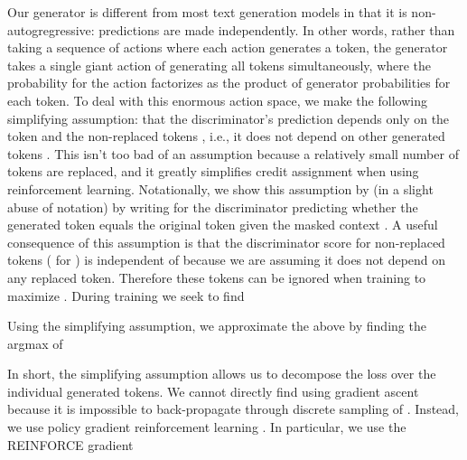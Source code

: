 \documentclass{article}
\newcommand{\alns}[1] {
	
}
\newcommand{\bmx}{\bm{x}^\text{masked}}
\newcommand{\bfx}{\bm{x}^\text{corrupt}}
\newcommand{\fx}{x^\text{corrupt}}
\newcommand{\bx}{\bm{x}}
\newcommand{\hbx}{\hat{\bm{x}}}
\newcommand{\E} {\mathop{\mathbb{E}}}
\newcommand{\D}{D}
\newcommand{\I}{\bm{m}}
\newcommand{\lossds}{\mathcal{L}_\text{Disc}}
\DeclareMathOperator*{\argmax}{arg\,max}
\begin{document}
Our generator is different from most text generation models in that it is non-autogregressive: predictions are made independently. 
In other words, rather than taking a sequence of actions where each action generates a token, the generator takes a single giant action of generating all tokens simultaneously, where the probability for the action factorizes as the product of generator probabilities for each token. 
To deal with this enormous action space, we make the following simplifying assumption: that the discriminator's prediction  depends only on the token  and the non-replaced tokens , i.e., it does not depend on other generated tokens . This isn't too bad of an assumption because a relatively small number of tokens are replaced, and it greatly simplifies credit assignment when using reinforcement learning. 
Notationally, we show this assumption by (in a slight abuse of notation) by writing  for the discriminator predicting whether the generated token  equals the original token  given the masked context . 
A useful consequence of this assumption is that the discriminator score for non-replaced tokens ( for ) is independent of  because we are assuming it does not depend on any replaced token. Therefore these tokens can be ignored when training  to maximize . 
During training we seek to find 
\alns{
\argmax_{\theta_G} \lossds = \argmax_{\theta_G} \E_{\bx, \I, \hbx} \Bigg(\sum_{t=1}^n -&\mathbbm{1}(\fx_t = x_t)\log \D(\bfx, t) - \\ &\mathbbm{1}(\fx_t \neq x_t)\log(1 - \D(\bfx, t)) \Bigg)
}
Using the simplifying assumption, we approximate the above by finding the argmax of 
\alns{
&\E_{\bx, \I, \hbx} \Bigg(\sum_{t \in \I}- \mathbbm{1}(\hat{x}_t = x_t)\log \D(\hat{x}|\bmx) - \mathbbm{1}(\hat{x}_t \neq x_t)\log(1 - \D(\hat{x}|\bmx)) \Bigg) \\
= &\E_{\bx, \I} \sum_{t \in \I} \E_{\hat{x}_t \sim p_G} R(\hat{x}_t, \bx) \\
&\text{where } R(\hat{x}_t, \bx) = \begin{cases}
      -\log \D(\hat{x}_t|\bmx) & \text{if}\ \hat{x}_t = x_t \\
      -\log(1 - \D(\hat{x}_t|\bmx)) & \text{otherwise}
    \end{cases}
}
In short, the simplifying assumption allows us to decompose the loss over the individual generated tokens. 
We cannot directly find  using gradient ascent because it is impossible to back-propagate through discrete sampling of .
Instead, we use policy gradient reinforcement learning \citep{Williams1992SimpleSG}.
In particular, we use the REINFORCE gradient
\alns{
    \nabla_{\theta_G} \lossds \approx \E_{\bx, \I} \sum_{t \in \I}\E_{\hat{x}_t \sim p_G} \nabla_{\theta_g} \log p_G(\hat{x}_t|\bmx) [R(\hat{x}_t, \bx) - b(\bmx, t)]
}
\end{document}

